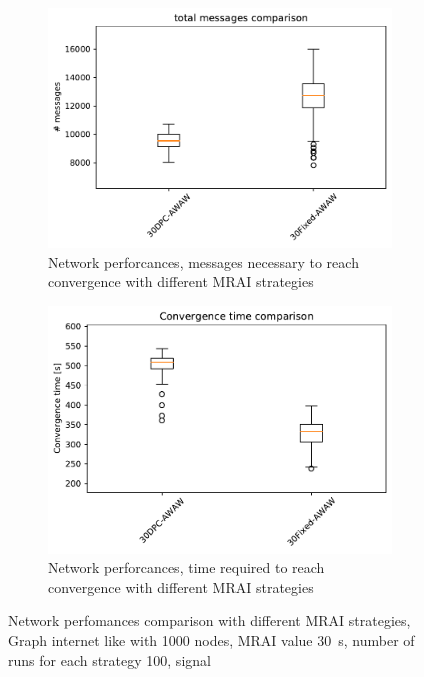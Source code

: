 \begin{figure}[h]
     \centering
     \begin{subfigure}[b]{0.45\textwidth}
         \centering
         \includegraphics[width=\textwidth]{images/internet_like/1000/comparison/comparison_AWAW_messages_boxplot.pdf}
		 \caption{Network perforcances, messages necessary to reach convergence
			with different \ac{MRAI} strategies}
         \label{fig:boxplot_internet_like_1000_messages_AWAW}
     \end{subfigure}
     \hfill
     \begin{subfigure}[b]{0.45\textwidth}
         \centering
         \includegraphics[width=\textwidth]{images/internet_like/1000/comparison/comparison_AWAW_time_boxplot.pdf}
		 \caption{Network perforcances, time required to reach convergence
			with different \ac{MRAI} strategies}
         \label{fig:boxplot_internet_like_1000_time_AWAW}
     \end{subfigure}
	 \caption{Network perfomances comparison with different \ac{MRAI} strategies,
		Graph internet like with \num{1000} nodes, \ac{MRAI} value 
		\SI{30}{\second}, number of runs for each strategy \num{100}, signal }
        \label{fig:boxplot_internet_like_1000_AWAW}
\end{figure}

